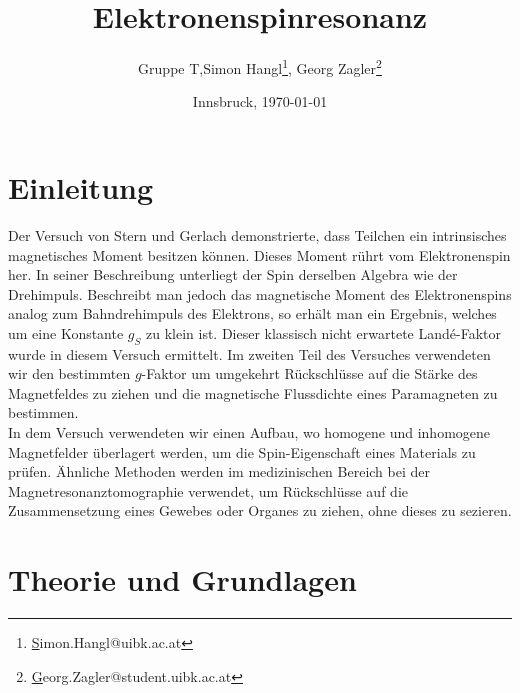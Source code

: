 \documentclass[a4paper,10pt]{scrartcl} %
\title{Elektronenspinresonanz}
\author{Gruppe T,Simon Hangl\footnote{\href{mailto:simon.hangl@uibk.ac.at}Simon.Hangl@uibk.ac.at}, Georg Zagler\footnote{\href{mailto:georg.zagler@student.uibk.ac.at}Georg.Zagler@student.uibk.ac.at}}
\date{Innsbruck, \today}
\begin{document}
\maketitle
\newpage{}
\tableofcontents{}
\newpage{}


\section{Einleitung}
\label{sec:einleitung}
Der Versuch von Stern und Gerlach demonstrierte, dass Teilchen ein intrinsisches magnetisches Moment besitzen können\cite{Schwabl}. Dieses Moment rührt vom Elektronenspin her. In seiner Beschreibung unterliegt der Spin derselben Algebra wie der Drehimpuls. Beschreibt man jedoch das magnetische Moment des Elektronenspins analog zum Bahndrehimpuls des Elektrons, so erhält man ein Ergebnis, welches um eine Konstante $g_S$ zu klein ist. Dieser klassisch nicht erwartete Landé-Faktor wurde in diesem Versuch ermittelt. Im zweiten Teil des Versuches verwendeten wir den bestimmten $g$-Faktor um umgekehrt Rückschlüsse auf die Stärke des Magnetfeldes zu ziehen und die magnetische Flussdichte eines Paramagneten zu bestimmen.\\
In dem Versuch verwendeten wir einen Aufbau, wo homogene und inhomogene Magnetfelder überlagert werden, um die Spin-Eigenschaft eines Materials zu prüfen. Ähnliche Methoden werden im medizinischen Bereich bei der Magnetresonanztomographie verwendet, um Rückschlüsse auf die Zusammensetzung eines Gewebes oder Organes zu ziehen, ohne dieses zu sezieren.

\section{Theorie und Grundlagen}
\label{sec:theorie}
\end{document}
